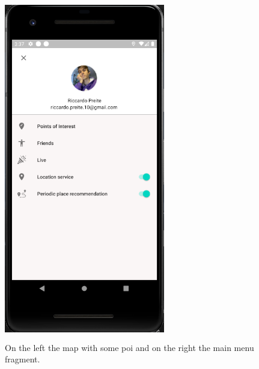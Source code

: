 \documentclass[../main]{subfiles}
\begin{document}
\begin{figure}[H]
    \includegraphics[width=70mm,height=150mm]{images/app/main_menu.png}
    \caption{On the left the map with some poi and on the right the main menu fragment.}
\end{figure}






\end{document}
